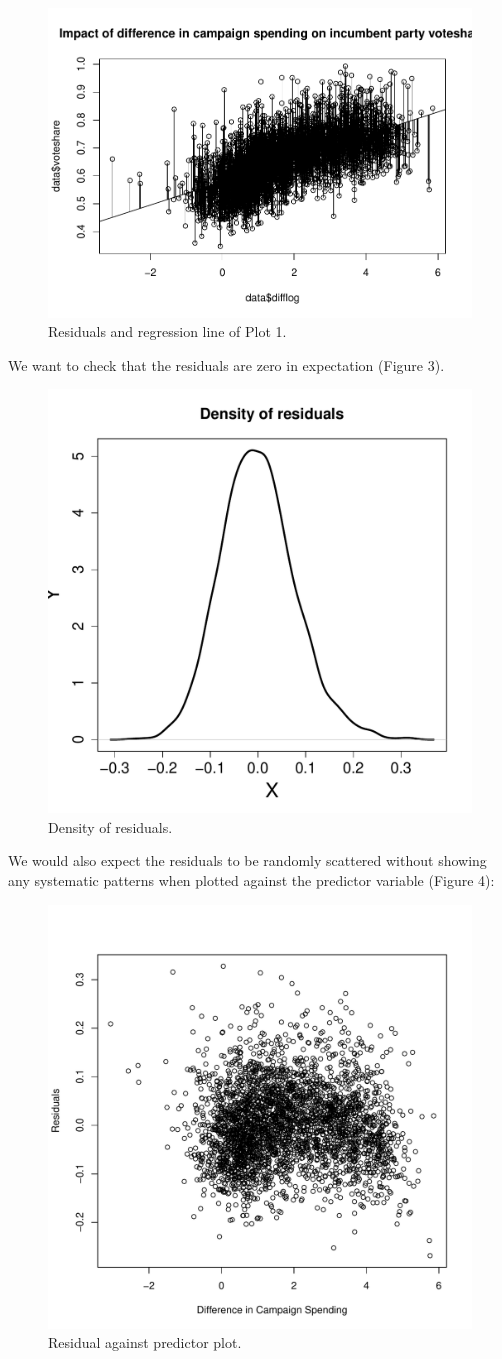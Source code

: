 \documentclass[12pt,letterpaper]{article}
\begin{document}
\begin{enumerate}
\begin{figure}[h!]\centering
	\caption{\footnotesize Residuals and regression line of Plot 1.}
	\label{fig:plot_2}
	\includegraphics[width=.5\textwidth]{plot2_residuals and regression line.pdf}
\end{figure}
\noindent We want to check that the residuals are zero in expectation (Figure 3).\\
\vspace{.5cm}
  
\vspace{.5cm}  
\begin{figure}[h!]\centering
	\caption{\footnotesize Density of residuals.}
	\label{fig:plot_3}
	\includegraphics[width=.5\textwidth]{plot3_density of residuals.pdf}
\end{figure}
\noindent We would also expect the residuals to be randomly scattered without showing any  systematic patterns when plotted against the predictor variable (Figure 4):\\
\vspace{.5cm}
  
\vspace{.5cm}  
\begin{figure}[h!]\centering
	\caption{\footnotesize Residual against predictor plot.}
	\label{fig:plot_4}
	\includegraphics[width=.5\textwidth]{plot4_residual against predictor.pdf}

\end{figure}
\end{enumerate}
\end{document}
